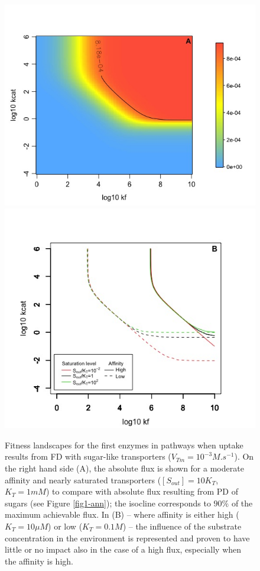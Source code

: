 \begin{figure}[htb!]
\begin{center}
\includegraphics[scale=0.4,trim=0cm 0cm 0cm 1.5cm,clip]{pics/SM-Enzymes/Fit_Landscape2D_FD_abs_sugars.jpeg} 
\includegraphics[scale=0.4,trim=0cm 0cm 0cm 1.5cm,clip]{pics/SM-Enzymes/2DFit_NonSatToSat_sugars.jpeg}   
\caption{Fitness landscapes for the first enzymes in pathways when uptake results from FD with sugar-like transporters ($V_{Tm}=10^{-3}M.s^{-1}$). On the right hand side (A), the absolute flux is shown for a moderate affinity and nearly saturated transporters ($[S_{out}]=10K_T$, $K_T=1mM$) to compare with absolute flux resulting from PD of sugars (see Figure \ref{fig1-ann}); the isocline corresponds to $90\%$ of the maximum achievable flux. In (B) -- where affinity is either high ($K_T=10\mu M$) or low ($K_T=0.1M$) -- the influence of the substrate concentration in the environment is represented and proven to have little or no impact also in the case of a high flux, especially when the affinity is high.}
\label{fig2-ann}
\end{center}
\end{figure}

